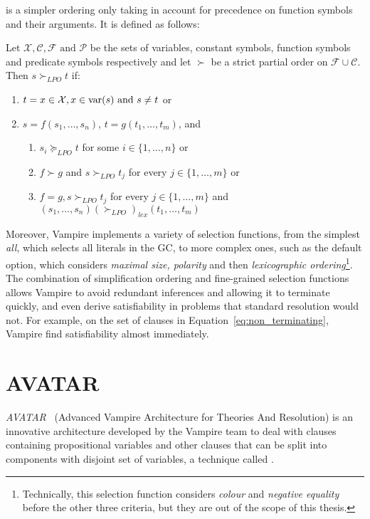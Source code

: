  is a simpler ordering only taking in account for precedence on function symbols and their arguments.
It is defined as follows:
\begin{definition}
  Let \(\mathcal{X},\mathcal{C},\mathcal{F} \text{ and } \mathcal{P}\) be the sets of variables, constant symbols, function symbols and predicate symbols respectively and let \(\succ\) be a strict partial order on \(\mathcal{F} \cup \mathcal{C}\).
  Then \(s\succ_{LPO} t\) if:
  \begin{enumerate}
    \item \(t = x \in \mathcal{X}, x \in \text{var} (s) \text{ and } s \neq t\) or
    \item \(s = f(s_1,\ldots,s_n)\), \(t = g(t_1,\ldots,t_m)\), and
          \begin{enumerate}
            \item \(s_i \succeq_{LPO} t\) for some \(i \in \{1,\ldots,n\}\) or
            \item \(f \succ g\) and \(s \succ_{LPO} t_j\) for every \(j \in \{1,\ldots,m\}\) or
            \item \(f = g, s \succ_{LPO} t_j\) for every \(j \in \{1,\ldots,m\}\) and \((s_1, \ldots, s_n) {(\succ_{LPO})}_{lex} (t_1, \ldots, t_m)\)
          \end{enumerate}
  \end{enumerate}
\end{definition}

Moreover, Vampire implements a variety of selection functions, from the simplest \emph{all}, which selects all literals in the GC, to more complex ones, such as the default option, which considers \emph{maximal size, polarity} and then \emph{lexicographic ordering}\footnote{
  Technically, this selection function considers \emph{colour} and \emph{negative equality} before the other three criteria, but they are out of the scope of this thesis.
}.
The combination of simplification ordering and fine-grained selection functions allows Vampire to avoid redundant inferences and allowing it to terminate quickly, and even derive satisfiability in problems that standard resolution would not.
For example, on the set of clauses in Equation~\ref{eq:non_terminating}, Vampire find satisfiability almost immediately.

\section{AVATAR}\label{sec:avatar-architecture}

\emph{AVATAR}~\cite{AVATAR} (Advanced Vampire Architecture for Theories And Resolution) is an innovative architecture developed by the Vampire team to deal with clauses containing propositional variables and other clauses that can be split into components with disjoint set of variables, a technique called .

